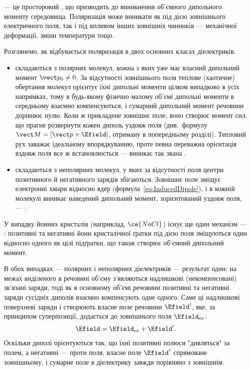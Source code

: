 \begin{Attention}
	 --- це просторовий , що призводить до виникнення об'ємного дипольного моменту
	середовища. Поляризація може виникати як під дією зовнішнього електричного поля, так і під впливом інших зовнішніх чинників --- механічної
	деформації, зміни температури тощо.
\end{Attention}

Розглянемо, як відбувається поляризація в двох основних класах діелектриків.

\begin{itemize}
	\item {} складаються з полярних молекул, кожна з яких уже має власний дипольний момент $\vect p_0 \neq 0$. За
	      відсутності зовнішнього поля теплове (хаотичне) обертання молекул орієнтує їхні дипольні моменти цілком випадково в усіх напрямках, тому в
	      будь-якому фізично малому об'ємі дипольні моменти в середньому взаємно компенсуються, і сумарний дипольний момент речовини дорівнює нулю.
	      Коли ж прикладене зовнішнє поле, воно створює момент сил, що прагне розвернути кожен диполь уздовж поля (див.~формулу
	      $\vect M = [\vect p\times\Efield]$, отриману в попередньому розділі). Тепловий рух заважає ідеальному впорядкуванню, проте певна переважна
	      орієнтація вздовж поля все ж встановлюється --- виникає так звана .
	\item {} складаються з неполярних молекул, у яких за відсутності поля центри позитивного й негативного зарядів
	      збігаються. Зовнішнє поле зміщує електронні хмари відносно ядер (формула~\eqref{eq:InducedDipole}), і в кожній молекулі виникає наведений
	      дипольний момент, зорієнтований уздовж поля, --- .
\end{itemize}

У випадку йонних кристалів (наприклад, $\ce{NaCl}$) існує ще один механізм --- : позитивні та негативні йони кристалічної
ґратки під дією поля зміщуються один відносно одного як цілі підґратки, що також створює об'ємний дипольний момент.

В обох випадках --- полярних і неполярних діелектриків --- результат один: на межах виділеного в речовині об'єму з'являються надлишкові
(некомпенсовані) зв'язані заряди, тоді як в основному об'ємі речовини позитивні та негативні заряди сусідніх диполів взаємно компенсують одне одного.
Саме ці надлишкові поверхневі заряди і створюють власне поле речовини $\Efield'$, яке, за принципом суперпозиції, додається до зовнішнього поля
$\Efield_\text{ex}$:
\begin{equation*}
	\Efield = \Efield_\text{ex} + \Efield'.
\end{equation*}
Оскільки диполі орієнтуються так, що їхні позитивні полюси "дивляться" за полем, а негативні --- проти поля, власне поле $\Efield'$ спрямоване
 зовнішньому, і сумарне поле в діелектрику завжди  порівняно з зовнішнім.


